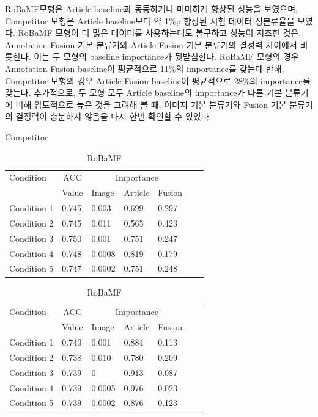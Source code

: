 \documentclass{article}
\begin{document}
RoBaMF모형은 Article baseline과 동등하거나 미미하게 향상된 성능을 보였으며,
Competitor 모형은 Article baseline보다 약 1\%p 향상된 시험 데이터 정분류율을 보였다.
RoBaMF 모형이 더 많은 데이터를 사용하는데도 불구하고 성능이 저조한 것은,  Annotation-Fusion 기본 분류기와 Article-Fusion 기본 분류기의 결정력 차이에서 비롯한다.
이는 두 모형의 baseline importance가 뒷받침한다.
 RoBaMF 모형의 경우 Annotation-Fusion baseline이 평균적으로 11\%의 importance를 갖는데 반해, Competitor 모형의 경우 Article-Fusion baseline이 평균적으로 28\%의 importance를 갖는다.
추가적으로, 두 모형 모두 Article baseline의 importance가 다른 기본 분류기에 비해 압도적으로 높은 것을 고려해 볼 때, 이미지 기본 분류기와 Fusion 기본 분류기의 결정력이 충분하지 않음을 다시 한번 확인할 수 있었다.

\begin{table}[htbp]
\centering
\begin{minipage}[t]{0.45\textwidth}
\centering
\caption{Competitor}
\label{tab:competitor}
\begin{tabular}{@{}lllllll@{}}
\toprule
Condition       & \multicolumn{1}{c|}{ACC} & \multicolumn{3}{c}{Importance} \\
             & Value      & Image      & Article      & Fusion     \\
\midrule
Condition 1   & 0.745         & 0.003         & 0.699         & 0.297       \\
Condition 2   & 0.745         & 0.011         & 0.565         & 0.423       \\
Condition 3   & 0.750         & 0.001         & 0.751         & 0.247       \\
Condition 4   & 0.748         & 0.0008        & 0.819         & 0.179       \\
Condition 5   & 0.747         & 0.0002        & 0.751         & 0.248       \\
\bottomrule
\end{tabular}
\end{minipage}
\hfill
\begin{minipage}[t]{0.45\textwidth}
\centering
\caption{RoBaMF}
\label{tab:robamf}
\begin{tabular}{@{}lllllll@{}}
\toprule
Condition       & \multicolumn{1}{c|}{ACC} & \multicolumn{3}{c}{Importance} \\
             & Value      & Image      & Article      & Fusion     \\
\midrule
Condition 1   & 0.740         & 0.001         & 0.884         & 0.113       \\
Condition 2   & 0.738         & 0.010         & 0.780         & 0.209       \\
Condition 3   & 0.739         & 0              & 0.913         & 0.087       \\
Condition 4   & 0.739         & 0.0005        & 0.976         & 0.023       \\
Condition 5   & 0.739         & 0.0002        & 0.876         & 0.123       \\
\bottomrule
\end{tabular}
\end{minipage}
\end{table}
\end{document}
